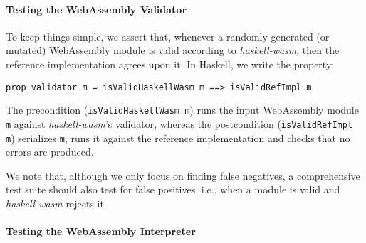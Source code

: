 \documentclass[sigconf,review,anonymous]{acmart}
\begin{document}

\paragraph{Testing the WebAssembly Validator}

To keep things simple, we assert that, whenever a randomly generated (or
mutated) WebAssembly module is valid according to \textit{haskell-wasm}, then
the reference implementation agrees upon it.
%
%
In Haskell, we write the property:

\begin{verbatim}
prop_validator m = isValidHaskellWasm m ==> isValidRefImpl m
\end{verbatim}

\noindent The precondition (\texttt{isValidHaskellWasm m}) runs the input
WebAssembly module \texttt{m} against \textit{haskell-wasm}'s validator, whereas
the postcondition (\texttt{isValidRefImpl m}) serializes \texttt{m}, runs it
against the reference implementation and checks that no errors are produced.

We note that, although we only focus on finding false negatives, a comprehensive
test suite should also test for false positives, i.e., when a module is valid
and \textit{haskell-wasm} rejects it.
%
%




\paragraph{Testing the WebAssembly Interpreter}
\end{document}
